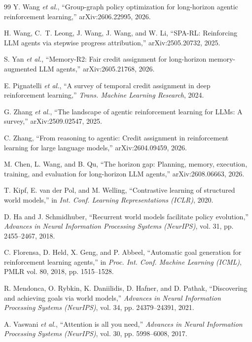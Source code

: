\documentclass[conference]{IEEEtran}
\begin{document}
\begin{thebibliography}{99}
 Y. Wang \emph{et al.}, ``Group-graph policy optimization for long-horizon agentic reinforcement learning,'' arXiv:2606.22995, 2026.

 H. Wang, C.~T. Leong, J. Wang, J. Wang, and W. Li, ``SPA-RL: Reinforcing LLM agents via stepwise progress attribution,'' arXiv:2505.20732, 2025.

 S. Yan \emph{et al.}, ``Memory-R2: Fair credit assignment for long-horizon memory-augmented LLM agents,'' arXiv:2605.21768, 2026.

 E. Pignatelli \emph{et al.}, ``A survey of temporal credit assignment in deep reinforcement learning,'' \emph{Trans. Machine Learning Research}, 2024.

 G. Zhang \emph{et al.}, ``The landscape of agentic reinforcement learning for LLMs: A survey,'' arXiv:2509.02547, 2025.

 C. Zhang, ``From reasoning to agentic: Credit assignment in reinforcement learning for large language models,'' arXiv:2604.09459, 2026.

 M. Chen, L. Wang, and B. Qu, ``The horizon gap: Planning, memory, execution, training, and evaluation for long-horizon LLM agents,'' arXiv:2608.06663, 2026.

 T. Kipf, E. van der Pol, and M. Welling, ``Contrastive learning of structured world models,'' in \emph{Int. Conf. Learning Representations (ICLR)}, 2020.

 D. Ha and J. Schmidhuber, ``Recurrent world models facilitate policy evolution,'' \emph{Advances in Neural Information Processing Systems (NeurIPS)}, vol. 31, pp. 2455--2467, 2018.

 C. Florensa, D. Held, X. Geng, and P. Abbeel, ``Automatic goal generation for reinforcement learning agents,'' in \emph{Proc. Int. Conf. Machine Learning (ICML)}, PMLR vol. 80, 2018, pp. 1515--1528.

 R. Mendonca, O. Rybkin, K. Daniilidis, D. Hafner, and D. Pathak, ``Discovering and achieving goals via world models,'' \emph{Advances in Neural Information Processing Systems (NeurIPS)}, vol. 34, pp. 24379--24391, 2021.

 A. Vaswani \emph{et al.}, ``Attention is all you need,'' \emph{Advances in Neural Information Processing Systems (NeurIPS)}, vol. 30, pp. 5998--6008, 2017.


\end{thebibliography}
\end{document}
